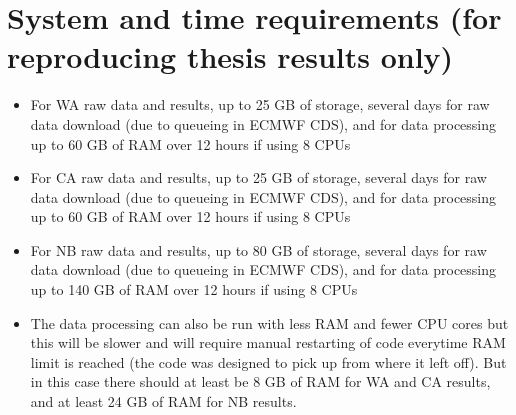 \section[System and time requirements]{System and time requirements (for reproducing thesis results only)}
\begin{itemize}
	\item For \acf{WA} raw data and results, up to 25 GB of storage, several days for raw data download (due to queueing in \ac{ECMWF} \ac{CDS}), and for data processing up to 60 GB of RAM over 12 hours if using 8 CPUs
	\item For \acf{CA} raw data and results, up to 25 GB of storage, several days for raw data download (due to queueing in \ac{ECMWF} \ac{CDS}), and for data processing up to 60 GB of RAM over 12 hours if using 8 CPUs
	\item For \acf{NB} raw data and results, up to 80 GB of storage, several days for raw data download (due to queueing in \ac{ECMWF} \ac{CDS}), and for data processing up to 140 GB of RAM over 12 hours if using 8 CPUs
	\item The data processing can also be run with less RAM and fewer CPU cores but this will be slower and will require manual restarting of code everytime RAM limit is reached (the code was designed to pick up from where it left off). But in this case there should at least be 8 GB of RAM for \ac{WA} and \ac{CA} results, and at least 24 GB of RAM for \ac{NB} results.
\end{itemize}
